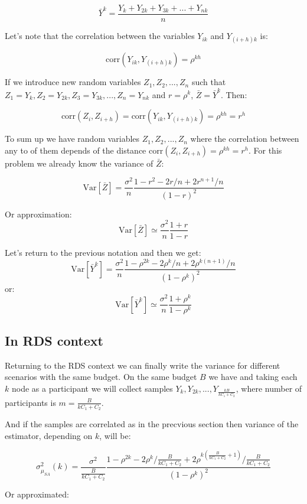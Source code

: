 \documentclass[12pt]{report}
\begin{document}
$$\bar{Y}^k = \frac{Y_k + Y_{2k} + Y_{3k} + ... + Y_{nk}}{n}$$

Let's note that the correlation between the variables $Y_{ik}$ and $Y_{(i+h)k}$ is: 

 $$\mathrm{corr}(Y_{ik}, Y_{(i+h)k}) = \rho^{kh}$$

If we introduce new random variables $Z_1, Z_2, ..., Z_n$ such that $Z_1 = Y_k, Z_2 = Y_{2k}, Z_3 = Y_{3k},..., Z_n = Y_{nk}$ and $r = \rho^k$, $\bar{Z}= \bar{Y}^k$. Then:

$$\mathrm{corr}(Z_i, Z_{i+h}) = \mathrm{corr}(Y_{ik}, Y_{(i+h)k}) = \rho^{kh} = r^h$$

To sum up we have random variables $Z_1, Z_2, ..., Z_n$ where the correlation between any to of them depends of the distance $\mathrm{corr}(Z_i, Z_{i+h}) = \rho^{kh} = r^h$. For this problem we already know the variance of $\bar{Z}$:


$$ \mathrm{Var}\left[\bar{Z} \right] = \frac{\sigma^2}{n}\frac{1-r^2 - 2r/n + 2r^{n+1}/n}{(1-r)^2}$$

Or approximation:
$$\mathrm{Var}\left[\bar{Z} \right] \simeq  \frac{\sigma^2}{n} \frac{1+r}{1-r}$$



Let's return to the previous notation and then we get:
$$\mathrm{Var}\left[\bar{Y}^k \right] = \frac{\sigma^2}{n}\frac{1-\rho^{2k} - 2\rho^k/n + 2\rho^{k(n+1)}/n}{(1-\rho^k)^2}$$
or:
$$\mathrm{Var}\left[\bar{Y}^k \right] \simeq  \frac{\sigma^2}{n} \frac{1+\rho^k}{1-\rho^k}$$


\subsection{In RDS context}

Returning to the RDS context we can finally write the variance for different scenarios with the same budget. On the same budget $B$ we have and taking each $k$ node as a participant we will collect samples $Y_k, Y_{2k}, ..., Y_{\frac{kB}{kC_1 + C_2}}$, where number of participants is $m = \frac{B}{kC_1 + C_2}$. 
 
And if the samples are correlated as in the precvious section then variance of the estimator, depending on $k$, will be:

$$ \sigma^2_{\hat{\mu}_{SA}} (k) = \frac{\sigma^2}{\frac{B}{kC_1 + C_2}}\frac{1-\rho^{2k} - 2\rho^k/\frac{B}{kC_1 + C_2} + 2\rho^{k(\frac{B}{kC_1 + C_2}+1)}/\frac{B}{kC_1 + C_2}}{(1-\rho^k)^2}$$

Or approximated:
\end{document}
